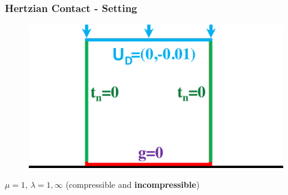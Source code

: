 \documentclass[8pt, oneside]{beamer}   	%
\newcommand{\titlecolor}[1]{\frametitle{\textcolor{dkgrey}{ \textbf{#1}}}}
\begin{document}
\begin{frame}
\titlecolor{Hertzian Contact - Setting}
\begin{figure}[htbp!]
\includegraphics[scale=0.2]{img/signorinisquare.pdf} 
\end{figure}
$ \mu = 1$, $ \lambda = 1, \infty$ (compressible and \textbf{incompressible})
\end{frame}
\end{document}
